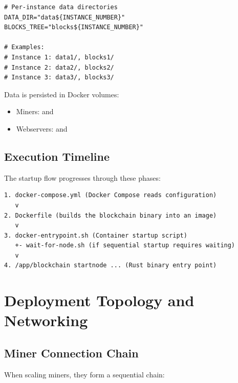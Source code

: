 \begin{listing}[htbp]
\caption{Data Directory Naming}
\label{lst:ch22-data-dir}
\begin{verbatim}
# Per-instance data directories
DATA_DIR="data${INSTANCE_NUMBER}"
BLOCKS_TREE="blocks${INSTANCE_NUMBER}"

# Examples:
# Instance 1: data1/, blocks1/
# Instance 2: data2/, blocks2/
# Instance 3: data3/, blocks3/
\end{verbatim}
\end{listing}

Data is persisted in Docker volumes:
\begin{itemize}
  \item Miners:  and 
  \item Webservers:  and 
\end{itemize}

\subsection{Execution Timeline}

The startup flow progresses through these phases:

\begin{listing}[htbp]
\caption{Docker Compose Startup Order}
\label{lst:ch22-exec-order}
\begin{verbatim}
1. docker-compose.yml (Docker Compose reads configuration)
   v
2. Dockerfile (builds the blockchain binary into an image)
   v
3. docker-entrypoint.sh (Container startup script)
   +- wait-for-node.sh (if sequential startup requires waiting)
   v
4. /app/blockchain startnode ... (Rust binary entry point)
\end{verbatim}
\end{listing}

\section{Deployment Topology and Networking}
\label{sec:docker-topology}

\subsection{Miner Connection Chain}

When scaling miners, they form a sequential chain:

